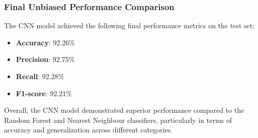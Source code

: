\subsubsection{Final Unbiased Performance Comparison}
The CNN model achieved the following final performance metrics on the test set:
\begin{itemize}
    \item \textbf{Accuracy}: 92.26\%
    \item \textbf{Precision}: 92.75\%
    \item \textbf{Recall}: 92.28\%
    \item \textbf{F1-score}: 92.21\%
\end{itemize}

Overall, the CNN model demonstrated superior performance compared to the Random Forest and Nearest Neighbour classifiers, particularly in terms of accuracy and generalization across different categories.

